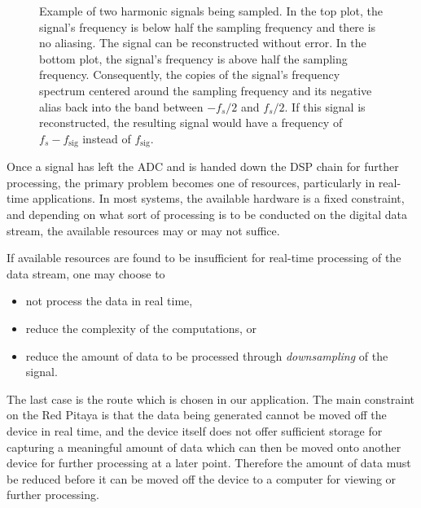\begin{figure}
    \centering
    
    \caption[Aliasing With Harmonic Signals]{%
        Example  of  two harmonic  signals  being  sampled. In the  top  plot,
        the  signal's  frequency is  below  half  the sampling  frequency  and
        there  is  no  aliasing. The   signal  can  be  reconstructed  without
        error.\protect\newline
        In the bottom plot, the signal's  frequency is above half the sampling
        frequency. Consequently, the copies of the signal's frequency spectrum
        centered around  the sampling  frequency and  its negative  alias back
        into  the  band  between  $-f_s/2$  and  $f_s/2$. If  this  signal  is
        reconstructed, the resulting  signal would have a frequency  of $f_s -
        f_{\mathrm{sig}}$ instead of $f_{\mathrm{sig}}$.%
    }
    \label{fig:aliasing:dirac}
\end{figure}


Once a signal  has left the ADC and  is handed down the DSP  chain for further
processing,  the primary  problem becomes  one of  resources, particularly  in
real-time applications. In  most systems,  the available  hardware is  a fixed
constraint, and depending on what sort of processing is to be conducted on the
digital data stream, the available resources may or may not suffice.

If available resources are found to be insufficient for real-time processing of
the data stream, one may choose to
\begin{itemize}\tightlist
    \item
        not process the data in real time,
    \item
        reduce the complexity of the computations, or
    \item
        reduce the amount of data to be processed through \emph{downsampling}
        of the signal.
\end{itemize}
The  last case  is the  route  which is  chosen in  our application. The  main
constraint on the Red Pitaya is that  the data being generated cannot be moved
off the device in  real time, and the device itself  does not offer sufficient
storage for capturing a meaningful amount of data which can then be moved onto
another device for  further processing at a later  point. Therefore the amount
of data must  be reduced before it can  be moved off the device  to a computer
for viewing or further processing.

